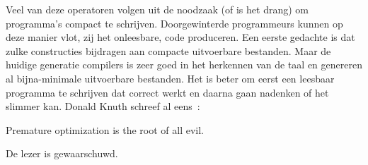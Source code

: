 Veel van deze operatoren volgen uit de noodzaak (of is het drang) om programma's compact te schrijven. Doorgewinterde programmeurs kunnen op deze manier vlot, zij het onleesbare, code produceren. Een eerste gedachte is dat zulke constructies bijdragen aan compacte uitvoerbare bestanden. Maar de huidige generatie compilers is zeer goed in het herkennen van de taal en genereren al bijna-minimale uitvoerbare bestanden. Het is beter om eerst een leesbaar programma te schrijven dat correct werkt en daarna gaan nadenken of het slimmer kan. Donald Knuth schreef al eens~\cite{knuth1974}:

\begin{displayquote}
Premature optimization is the root of all evil.
\end{displayquote}
De lezer is gewaarschuwd.
